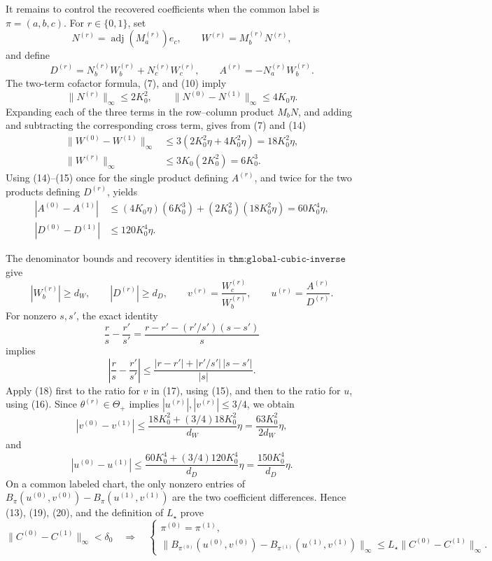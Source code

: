 It remains to control the recovered coefficients when the common label is \(\pi=(a,b,c)\).  For \(r\in\{0,1\}\), set
\[
 N^{(r)}=\operatorname{adj}(M_a^{(r)})e_c,
 \qquad
 W^{(r)}=M_b^{(r)}N^{(r)},
\]
and define
\[
 D^{(r)}=N_b^{(r)}W_b^{(r)}+N_c^{(r)}W_c^{(r)},
 \qquad
 A^{(r)}=-N_a^{(r)}W_b^{(r)}.
\]
The two-term cofactor formula, (7), and (10) imply
\[
 \|N^{(r)}\|_\infty\leq2K_0^2,
 \qquad
 \|N^{(0)}-N^{(1)}\|_\infty\leq4K_0\eta.                       \tag{14}
\]
Expanding each of the three terms in the row--column product \(M_bN\), and adding and subtracting the corresponding cross term, gives from (7) and (14)
\[
 \begin{aligned}
 \|W^{(0)}-W^{(1)}\|_\infty
 &\leq3\left(2K_0^2\eta+4K_0^2\eta\right)
 =18K_0^2\eta,\\
 \|W^{(r)}\|_\infty
 &\leq3K_0(2K_0^2)=6K_0^3.
 \end{aligned}                                                     \tag{15}
\]
Using (14)--(15) once for the single product defining \(A^{(r)}\), and twice for the two products defining \(D^{(r)}\), yields
\[
 \begin{aligned}
 |A^{(0)}-A^{(1)}|
 &\leq(4K_0\eta)(6K_0^3)+(2K_0^2)(18K_0^2\eta)
 =60K_0^4\eta,\\
 |D^{(0)}-D^{(1)}|
 &\leq120K_0^4\eta.
 \end{aligned}                                                     \tag{16}
\]

The denominator bounds and recovery identities in \(\texttt{thm:global-cubic-inverse}\) give
\[
 |W_b^{(r)}|\geq d_W,
 \qquad |D^{(r)}|\geq d_D,
 \qquad
 v^{(r)}=\frac{W_c^{(r)}}{W_b^{(r)}},
 \qquad
 u^{(r)}=\frac{A^{(r)}}{D^{(r)}}.                                  \tag{17}
\]
For nonzero \(s,s'\), the exact identity
\[
 \frac{r}{s}-\frac{r'}{s'}
 =\frac{r-r'-(r'/s')(s-s')}{s}
\]
implies
\[
 \left|\frac{r}{s}-\frac{r'}{s'}\right|
 \leq\frac{|r-r'|+|r'/s'|\,|s-s'|}{|s|}.                         \tag{18}
\]
Apply (18) first to the ratio for \(v\) in (17), using (15), and then to the ratio for \(u\), using (16).  Since \(\theta^{(r)}\in\Theta_+\) implies \(|u^{(r)}|,|v^{(r)}|\leq3/4\), we obtain
\[
 |v^{(0)}-v^{(1)}|
 \leq
 \frac{18K_0^2+(3/4)18K_0^2}{d_W}\eta
 =\frac{63K_0^2}{2d_W}\eta,                                      \tag{19}
\]
and
\[
 |u^{(0)}-u^{(1)}|
 \leq
 \frac{60K_0^4+(3/4)120K_0^4}{d_D}\eta
 =\frac{150K_0^4}{d_D}\eta.                                      \tag{20}
\]
On a common labeled chart, the only nonzero entries of
\(B_\pi(u^{(0)},v^{(0)})-B_\pi(u^{(1)},v^{(1)})\) are the two coefficient differences.  Hence (13), (19), (20), and the definition of \(L_\star\) prove
\[
 \|C^{(0)}-C^{(1)}\|_\infty<\delta_0
 \quad\Longrightarrow\quad
 \begin{cases}
 \pi^{(0)}=\pi^{(1)},\\[2pt]
 \|B_{\pi^{(0)}}(u^{(0)},v^{(0)})
      -B_{\pi^{(1)}}(u^{(1)},v^{(1)})\|_\infty
 \leq L_\star\|C^{(0)}-C^{(1)}\|_\infty.
 \end{cases}                                                       \tag{21}
\]


